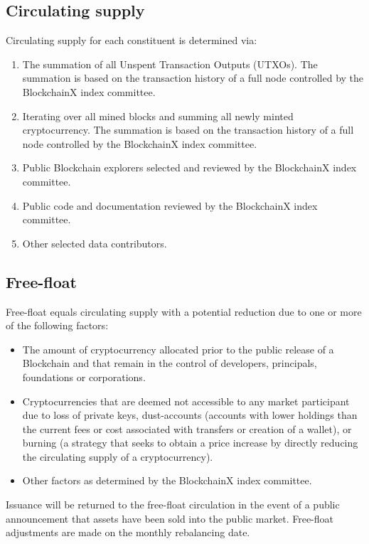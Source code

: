 \documentclass{article}
\begin{document}
\subsection{Circulating supply}
Circulating supply for each constituent is determined via:
\begin{enumerate}
\item The summation of all Unspent Transaction Outputs (UTXOs). The summation is based on the transaction history of a full node controlled by the BlockchainX index committee.
\item Iterating over all mined blocks and summing all newly minted cryptocurrency. The summation is based on the transaction history of a full node controlled by the BlockchainX index committee. 
 \item Public Blockchain explorers selected and reviewed by the BlockchainX index committee.
 \item Public code and documentation reviewed by the BlockchainX index committee.
 \item Other selected data contributors. 
 \end{enumerate}


\subsection{Free-float}
Free-float equals circulating supply with a potential reduction due to one or more of the following factors:

\begin{itemize}
 \item The amount of cryptocurrency allocated prior to the public release
   of a Blockchain and that remain in the control of developers, principals,
   foundations or corporations.
\item Cryptocurrencies that are deemed not accessible to any market
  participant due to loss of private keys, dust-accounts (accounts with lower holdings than the current fees or cost associated with transfers or creation of a wallet), or burning (a strategy that
  seeks to obtain a price increase by directly reducing the circulating supply of
  a cryptocurrency). 
\item Other factors as determined by the BlockchainX index committee.
\end{itemize}
Issuance will be returned to the free-float circulation in the event of a public announcement that assets have been sold into the public market. Free-float adjustments are made on the monthly rebalancing date.
\end{document}
